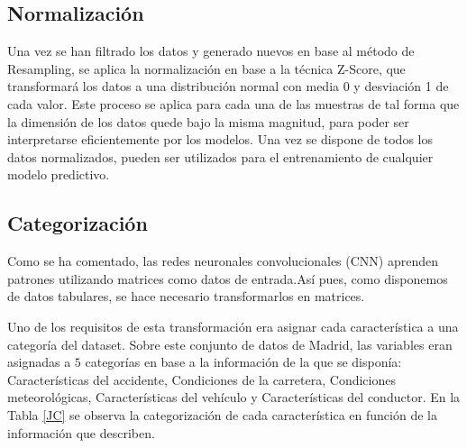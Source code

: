 \documentclass{uathesis-es}
\begin{document}
{		\subsection*{Normalización}
		
		
		
		Una vez se han filtrado los datos y generado nuevos en base al método de Resampling, se aplica la normalización en base a la técnica Z-Score, que transformará los datos a una distribución normal con media 0 y desviación 1 de cada valor. Este proceso se aplica para cada una de las muestras de tal forma que la dimensión de los datos quede bajo la misma magnitud, para poder ser  interpretarse eficientemente por los modelos. Una vez se dispone de todos los datos normalizados, pueden ser utilizados para el entrenamiento de cualquier modelo predictivo.
		
		
		\subsection*{Categorización}
		
		Como se ha comentado, las redes neuronales convolucionales (CNN) aprenden patrones utilizando matrices como datos de entrada.Así pues, como disponemos de datos tabulares, se hace necesario transformarlos en matrices.
		
		Uno de los requisitos de esta transformación era asignar cada característica a una categoría del dataset. Sobre este conjunto de datos de Madrid, las variables eran asignadas a $5$ categorías en base a la información de la que se disponía: Características del accidente, Condiciones de la carretera, Condiciones meteorológicas, Características del vehículo y Características del conductor. En la Tabla \ref{JC} se observa la categorización de cada característica en función de la información que describen.
		
		
}
\end{document}
